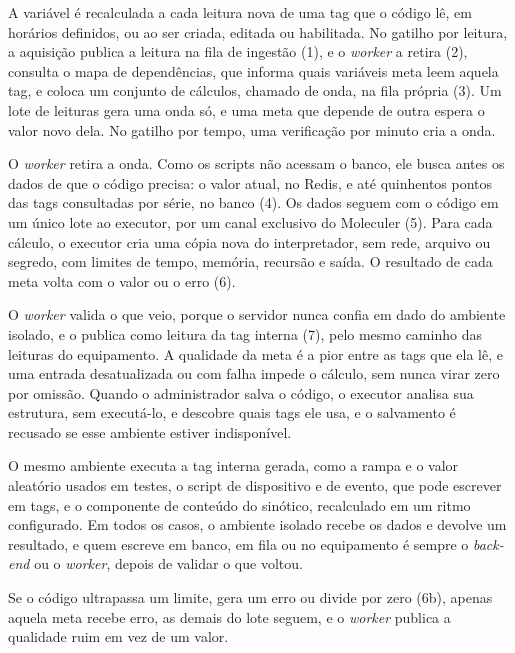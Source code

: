 \par A variável é recalculada a cada leitura nova de uma tag que o código lê, em horários definidos, ou ao ser criada, editada ou habilitada. No gatilho por leitura, a aquisição publica a leitura na fila de ingestão (1), e o \emph{worker} a retira (2), consulta o mapa de dependências, que informa quais variáveis meta leem aquela tag, e coloca um conjunto de cálculos, chamado de onda, na fila própria (3). Um lote de leituras gera uma onda só, e uma meta que depende de outra espera o valor novo dela. No gatilho por tempo, uma verificação por minuto cria a onda.

\par O \emph{worker} retira a onda. Como os scripts não acessam o banco, ele busca antes os dados de que o código precisa: o valor atual, no Redis, e até quinhentos pontos das tags consultadas por série, no banco (4). Os dados seguem com o código em um único lote ao executor, por um canal exclusivo do Moleculer (5). Para cada cálculo, o executor cria uma cópia nova do interpretador, sem rede, arquivo ou segredo, com limites de tempo, memória, recursão e saída. O resultado de cada meta volta com o valor ou o erro (6).

\par O \emph{worker} valida o que veio, porque o servidor nunca confia em dado do ambiente isolado, e o publica como leitura da tag interna (7), pelo mesmo caminho das leituras do equipamento. A qualidade da meta é a pior entre as tags que ela lê, e uma entrada desatualizada ou com falha impede o cálculo, sem nunca virar zero por omissão. Quando o administrador salva o código, o executor analisa sua estrutura, sem executá-lo, e descobre quais tags ele usa, e o salvamento é recusado se esse ambiente estiver indisponível.

\par O mesmo ambiente executa a tag interna gerada, como a rampa e o valor aleatório usados em testes, o script de dispositivo e de evento, que pode escrever em tags, e o componente de conteúdo do sinótico, recalculado em um ritmo configurado. Em todos os casos, o ambiente isolado recebe os dados e devolve um resultado, e quem escreve em banco, em fila ou no equipamento é sempre o \emph{back-end} ou o \emph{worker}, depois de validar o que voltou.

\par Se o código ultrapassa um limite, gera um erro ou divide por zero (6b), apenas aquela meta recebe erro, as demais do lote seguem, e o \emph{worker} publica a qualidade ruim em vez de um valor.

